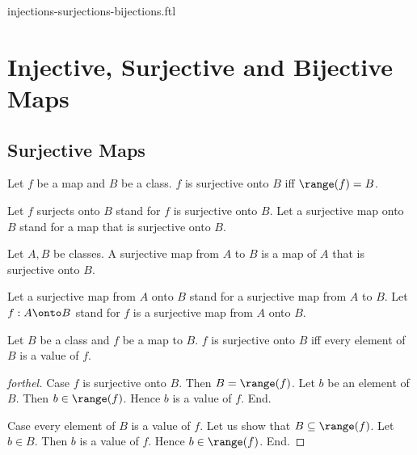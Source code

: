 \documentclass{naproche-library}
\begin{document}
\begin{smodule}{injections-surjections-bijections.ftl}


  \section*{Injective, Surjective and Bijective Maps}

  \subsection*{Surjective Maps}

  \begin{definition}[forthel,id=FOUNDATIONS_08_8681187805495296,printid]
    Let $f$ be a map and $B$ be a class.
    $f$ is surjective onto $B$ iff $\range(f) = B$.

    Let $f$ surjects onto $B$ stand for $f$ is surjective onto $B$.
    Let a surjective map onto $B$ stand for a map that is surjective onto $B$.
  \end{definition}

  \begin{definition}[forthel,id=FOUNDATIONS_08_4195237329108992,printid]
    Let $A, B$ be classes.
    A surjective map from $A$ to $B$ is a map of $A$ that is surjective onto $B$.

    Let a surjective map from $A$ onto $B$ stand for a surjective map from $A$ to $B$.
    Let $f: A \onto B$ stand for $f$ is a surjective map from $A$ onto $B$.
  \end{definition}

  \begin{proposition}[forthel,id=FOUNDATIONS_08_1974205941809152,printid]
    Let $B$ be a class and $f$ be a map to $B$.
    $f$ is surjective onto $B$ iff every element of $B$ is a value of $f$.
  \end{proposition}
  \begin{proof}[forthel]
    Case $f$ is surjective onto $B$.
      Then $B = \range(f)$.
      Let $b$ be an element of $B$.
      Then $b \in \range(f)$.
      Hence $b$ is a value of $f$.
    End.

    Case every element of $B$ is a value of $f$.
      Let us show that $B \subseteq \range(f)$.
        Let $b \in B$.
        Then $b$ is a value of $f$.
        Hence $b \in \range(f)$.
      End.


\end{proof}
\end{smodule}
\end{document}
